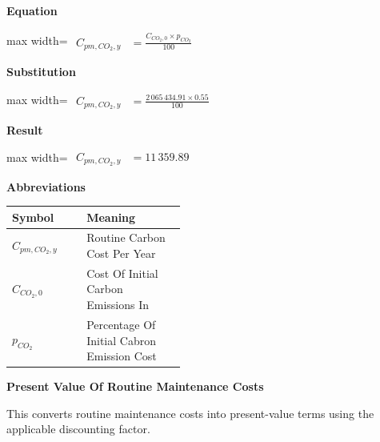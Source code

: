 \documentclass{article}
\begin{document}
\vspace{0.4em}
\textbf{Equation}\par\vspace{-0.35em}
\begin{center}
\begin{adjustbox}{max width=\linewidth}
$\displaystyle\begin{aligned}
C_{pm,CO_2,y} &= \frac{C_{CO_2,0} \times p_{CO_2}}{100}
\end{aligned}$
\end{adjustbox}
\end{center}
\vspace{0.4em}
\textbf{Substitution}\par\vspace{-0.35em}
\begin{center}
\begin{adjustbox}{max width=\linewidth}
$\displaystyle\begin{aligned}
C_{pm,CO_2,y} &= \frac{2\,065\,434.91 \times 0.55}{100}
\end{aligned}$
\end{adjustbox}
\end{center}
\vspace{0.4em}
\textbf{Result}\par\vspace{-0.35em}
\begin{center}
\begin{adjustbox}{max width=\linewidth}
$\displaystyle\begin{aligned}
C_{pm,CO_2,y} &= 11\,359.89
\end{aligned}$
\end{adjustbox}
\end{center}
\vspace{0.4em}
\textbf{Abbreviations}\par\vspace{-0.35em}
\begin{tabularx}{\linewidth}{>{\raggedright\arraybackslash}p{0.43\linewidth} >{\raggedright\arraybackslash}X}
\toprule
Symbol & Meaning \\
\midrule
$C_{pm,CO_2,y}$ & Routine Carbon Cost Per Year \\
$C_{CO_2,0}$ & Cost Of Initial Carbon Emissions In \\
$p_{CO_2}$ & Percentage Of Initial Cabron Emission Cost \\
\bottomrule
\end{tabularx}
\vspace{0.6em}
\vspace{0.4em}
\textbf{Present Value Of Routine Maintenance Costs}\par\vspace{-0.35em}
This converts routine maintenance costs into present-value terms using the applicable discounting factor.
\end{document}
